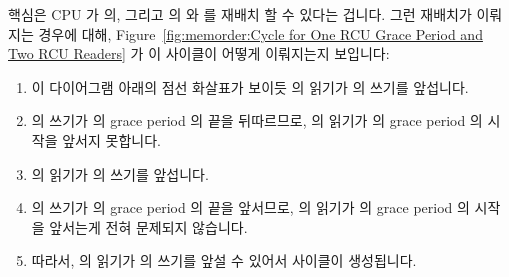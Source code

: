 핵심은 CPU 가  의, 그리고  의  와
 를 재배치 할 수 있다는 겁니다.
그런 재배치가 이뤄지는 경우에 대해,
Figure~\ref{fig:memorder:Cycle for One RCU Grace Period and Two RCU Readers}
가 이 사이클이 어떻게 이뤄지는지 보입니다:

\begin{enumerate}
\item	이 다이어그램 아래의 점선 화살표가 보이듯  의  읽기가
	 의 쓰기를 앞섭니다.
\item	{} 의 쓰기가  의 grace period 의 끝을 뒤따르므로,
	 의  읽기가  의 grace period 의 시작을 앞서지
	못합니다.
\item	{} 의  읽기가  의 쓰기를 앞섭니다.
\item	{} 의  쓰기가  의 grace period 의 끝을 앞서므로,
	 의  읽기가  의 grace period 의 시작을
	앞서는게 전혀 문제되지 않습니다.
\item	따라서,  의  읽기가  의 쓰기를 앞설 수 있어서
	사이클이 생성됩니다.

\end{enumerate}

